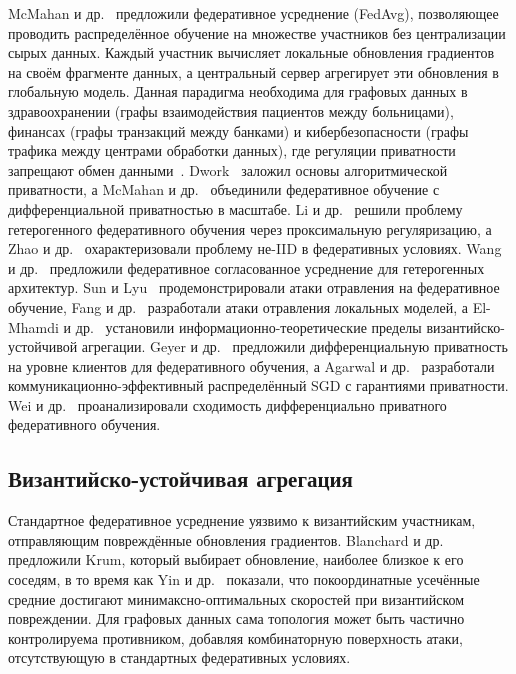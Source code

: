 McMahan и др.~\cite{McMahan2017} предложили федеративное усреднение (FedAvg), позволяющее проводить распределённое обучение на множестве участников без централизации сырых данных. Каждый участник вычисляет локальные обновления градиентов на своём фрагменте данных, а центральный сервер агрегирует эти обновления в глобальную модель. Данная парадигма необходима для графовых данных в здравоохранении (графы взаимодействия пациентов между больницами), финансах (графы транзакций между банками) и кибербезопасности (графы трафика между центрами обработки данных), где регуляции приватности запрещают обмен данными~\cite{Kairouz2021,Konecny2016,Mothukuri2021}. Dwork~\cite{Dwork2014} заложил основы алгоритмической приватности, а McMahan и др.~\cite{McMahan2018dp} объединили федеративное обучение с дифференциальной приватностью в масштабе. Li и др.~\cite{Li2020fedprox} решили проблему гетерогенного федеративного обучения через проксимальную регуляризацию, а Zhao и др.~\cite{Zhao2020fl_noniid} охарактеризовали проблему не-IID в федеративных условиях. Wang и др.~\cite{Wang2020fedma} предложили федеративное согласованное усреднение для гетерогенных архитектур. Sun и Lyu~\cite{Sun2019fl_poison} продемонстрировали атаки отравления на федеративное обучение, Fang и др.~\cite{Fang2020} разработали атаки отравления локальных моделей, а El-Mhamdi и др.~\cite{ElMhamdi2018} установили информационно-теоретические пределы византийско-устойчивой агрегации. Geyer и др.~\cite{Geyer2017} предложили дифференциальную приватность на уровне клиентов для федеративного обучения, а Agarwal и др.~\cite{Agarwal2018cpsgd,Bernstein2017,Bernstein2019} разработали коммуникационно-эффективный распределённый SGD с гарантиями приватности. Wei и др.~\cite{Wei2020dpfl} проанализировали сходимость дифференциально приватного федеративного обучения.


\subsection{Византийско-устойчивая агрегация}

Стандартное федеративное усреднение уязвимо к византийским участникам, отправляющим повреждённые обновления градиентов. Blanchard и др.~\cite{Blanchard2017} предложили Krum, который выбирает обновление, наиболее близкое к его соседям, в то время как Yin и др.~\cite{Yin2018} показали, что покоординатные усечённые средние достигают минимаксно-оптимальных скоростей при византийском повреждении. Для графовых данных сама топология может быть частично контролируема противником, добавляя комбинаторную поверхность атаки, отсутствующую в стандартных федеративных условиях.


